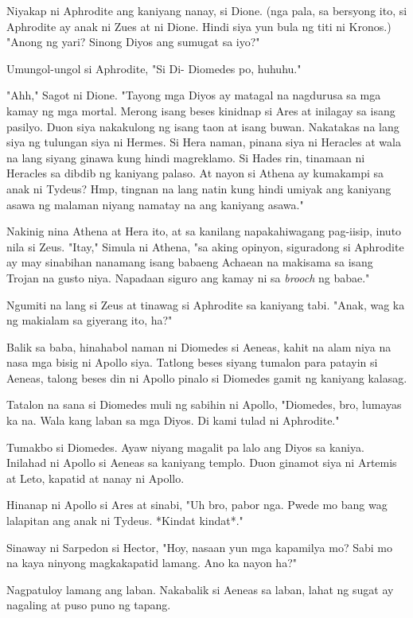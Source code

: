 \documentclass[12pt,letterpaper]{report}
\begin{document}
Niyakap ni Aphrodite ang kaniyang nanay, si Dione. (nga pala, sa bersyong ito, si Aphrodite ay anak ni Zues at ni Dione. Hindi siya yun bula ng titi ni Kronos.) "Anong ng yari? Sinong Diyos ang sumugat sa iyo?"

Umungol-ungol si Aphrodite, "Si Di- Diomedes po, huhuhu."

"Ahh," Sagot ni Dione. "Tayong mga Diyos ay matagal na nagdurusa sa mga kamay ng mga mortal. Merong isang beses kinidnap si Ares at inilagay sa isang pasilyo. Duon siya nakakulong ng isang taon at isang buwan. Nakatakas na lang siya ng tulungan siya ni Hermes. Si Hera naman, pinana siya ni Heracles at wala na lang siyang ginawa kung hindi magreklamo. Si Hades rin, tinamaan ni Heracles sa dibdib ng kaniyang palaso. At nayon si Athena ay kumakampi sa anak ni Tydeus? Hmp, tingnan na lang natin kung hindi umiyak ang kaniyang asawa ng malaman niyang namatay na ang kaniyang asawa."

Nakinig nina Athena at Hera ito, at sa kanilang napakahiwagang pag-iisip, inuto nila si Zeus. "Itay," Simula ni Athena, "sa aking opinyon, siguradong si Aphrodite ay may sinabihan nanamang isang babaeng Achaean na makisama sa isang Trojan na gusto niya. Napadaan siguro ang kamay ni sa \textit{brooch} ng babae."

Ngumiti na lang si Zeus at tinawag si Aphrodite sa kaniyang tabi. "Anak, wag ka ng makialam sa giyerang ito, ha?"

Balik sa baba, hinahabol naman ni Diomedes si Aeneas, kahit na alam niya na nasa mga bisig ni Apollo siya. Tatlong beses siyang tumalon para patayin si Aeneas, talong beses din ni Apollo pinalo si Diomedes gamit ng kaniyang kalasag.

Tatalon na sana si Diomedes muli ng sabihin ni Apollo, "Diomedes, bro, lumayas ka na. Wala kang laban sa mga Diyos. Di kami tulad ni Aphrodite."

Tumakbo si Diomedes. Ayaw niyang magalit pa lalo ang Diyos sa kaniya. Inilahad ni Apollo si Aeneas sa kaniyang templo. Duon ginamot siya ni Artemis at Leto, kapatid at nanay ni Apollo.

Hinanap ni Apollo si Ares at sinabi, "Uh bro, pabor nga. Pwede mo bang wag lalapitan ang anak ni Tydeus. *Kindat kindat*."

Sinaway ni Sarpedon si Hector, "Hoy, nasaan yun mga kapamilya mo? Sabi mo na kaya ninyong magkakapatid lamang. Ano ka nayon ha?"

Nagpatuloy lamang ang laban. Nakabalik si Aeneas sa laban, lahat ng sugat ay nagaling at puso puno ng tapang.
\end{document}
